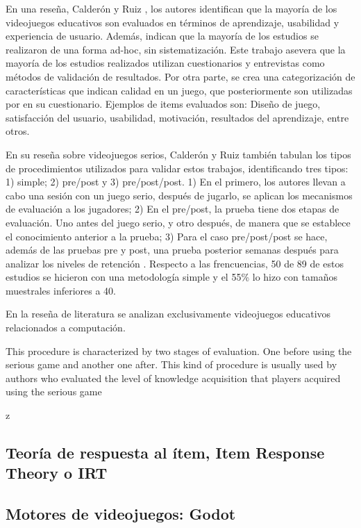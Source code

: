 En una reseña, Calderón y Ruiz \cite{CalderonRuizReviewSeriousGamesEvaluation}, los autores identifican que la mayoría de los videojuegos educativos son evaluados en términos de aprendizaje, usabilidad y experiencia de usuario. Además, indican que la mayoría de los estudios se realizaron de una forma ad-hoc, sin sistematización. Este trabajo asevera que la mayoría de los estudios realizados utilizan cuestionarios y entrevistas como métodos de validación de resultados. Por otra parte, se crea una categorización de características que indican calidad en un juego, que posteriormente son utilizadas por \cite{meegaplus} en su cuestionario. Ejemplos de items evaluados son: Diseño de juego, satisfacción del usuario, usabilidad, motivación, resultados del aprendizaje, entre otros.

En su reseña sobre videojuegos serios, Calderón y Ruiz también tabulan los tipos de procedimientos utilizados para validar estos trabajos, identificando tres tipos: 1) simple; 2) pre/post y 3) pre/post/post. 1) En el primero, los autores llevan a cabo una sesión con un juego serio, después de jugarlo, se aplican los mecanismos de evaluación a los jugadores; 2) En el pre/post, la prueba tiene dos etapas de evaluación. Uno antes del juego serio, y otro después, de manera que se establece el conocimiento anterior a la prueba; 3) Para el caso pre/post/post se hace, además de las pruebas pre y post, una prueba posterior semanas después para analizar los niveles de retención \cite{CalderonRuizReviewSeriousGamesEvaluation}. Respecto a las frencuencias, 50 de 89 de estos estudios se hicieron con una metodología simple y el 55\% lo hizo con tamaños muestrales inferiores a 40.

En la reseña de literatura \cite{ReviewGamesTeachingComputing} se analizan exclusivamente videojuegos educativos relacionados a computación. 
 


This procedure is characterized by two stages of evaluation. One before using the serious game and another one after. This kind of procedure is usually used by authors who evaluated the level of knowledge acquisition that players acquired using the serious game

z


\subsection{Teoría de respuesta al ítem, Item Response Theory o IRT}



\subsection{Motores de videojuegos: Godot}






